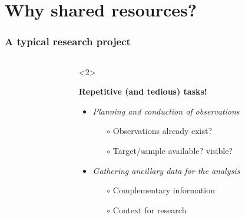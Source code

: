\section{Why shared resources?}


\begin{frame}
  \frametitle{A typical research project}

  \begin{columns}[T]

    \begin{column}{.4\textwidth}
      \begin{overlayarea}{\textwidth}{\textheight}
      \end{overlayarea}
    \end{column}


    \begin{column}{.6\textwidth}
      \begin{overlayarea}{\textwidth}{\textheight}
        \begin{onlyenv}<2>

          \vspace{1em}
          \textbf{Repetitive (and tedious) tasks!}\\
          \vspace{1em}
          \begin{itemize}[<.->]
            \item \emph{Planning and conduction of observations}
              \begin{itemize}[<.->]
                \item[$\circ$] Observations already exist?
                \item[$\circ$] Target/sample available? visible?
              \end{itemize}

            \vspace{0.5em}
            \item \emph{Gathering ancillary data for the analysis}
              \begin{itemize}[<.->]
                \item[$\circ$] Complementary information 
                \item[$\circ$] Context for research 
              \end{itemize}


\end{itemize}
\end{onlyenv}
\end{overlayarea}
\end{column}
\end{columns}
\end{frame}
